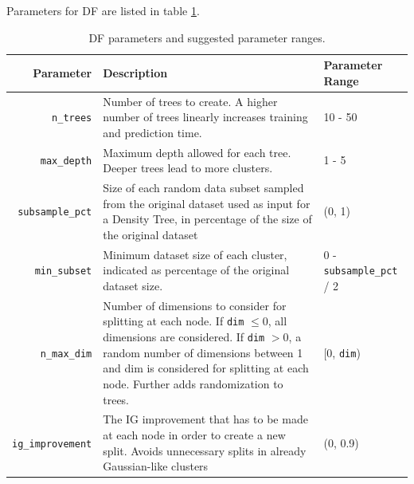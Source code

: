 \documentclass[10pt]{article}
\begin{document}
Parameters for \acrlong{DF} are listed in table \ref{table:df-parameters}.
\begin{table}[H]
	\centering
	\begin{tabular}{rp{7.7cm}l}
		\toprule
		Parameter & Description & Parameter Range \\ \midrule
		\texttt{n\_trees} & Number of trees to create. A higher number of trees linearly increases training and prediction time. & 10 - 50 \\
		\texttt{max\_depth} & Maximum depth allowed for each tree. Deeper trees lead to more clusters. & 1 - 5 \\
		\texttt{subsample\_pct} & Size of each random data subset sampled from the original dataset used as input for a Density Tree, in percentage of the size of the original dataset &  (0, 1) \\
		\texttt{min\_subset} & Minimum dataset size of each cluster, indicated as percentage of the original dataset size. & 0 - \texttt{subsample\_pct} / 2 \\
		\texttt{n\_max\_dim} & Number of dimensions to consider for splitting at each node. If \texttt{dim} $\leq 0$, all dimensions are considered. If \texttt{dim} $> 0$, a random number of dimensions between 1 and dim is considered for splitting at each node. Further adds randomization to trees. & ${[}$0, \texttt{dim}) \\
		\texttt{ig\_improvement} & The \acrlong{IG} improvement that has to be made at each node in order to create a new split. Avoids unnecessary splits in already Gaussian-like clusters & (0, 0.9) \\\bottomrule
	\end{tabular}
	\caption{\acrlong{DF} parameters and suggested parameter ranges.}
	\label{table:df-parameters}
\end{table}
\end{document}
